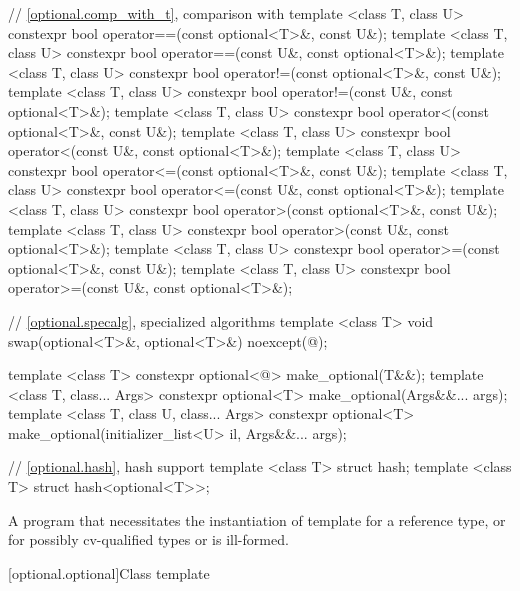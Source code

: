 \begin{codeblock}
{  // \ref{optional.comp_with_t}, comparison with 
  template <class T, class U> constexpr bool operator==(const optional<T>&, const U&);
  template <class T, class U> constexpr bool operator==(const U&, const optional<T>&);
  template <class T, class U> constexpr bool operator!=(const optional<T>&, const U&);
  template <class T, class U> constexpr bool operator!=(const U&, const optional<T>&);
  template <class T, class U> constexpr bool operator<(const optional<T>&, const U&);
  template <class T, class U> constexpr bool operator<(const U&, const optional<T>&);
  template <class T, class U> constexpr bool operator<=(const optional<T>&, const U&);
  template <class T, class U> constexpr bool operator<=(const U&, const optional<T>&);
  template <class T, class U> constexpr bool operator>(const optional<T>&, const U&);
  template <class T, class U> constexpr bool operator>(const U&, const optional<T>&);
  template <class T, class U> constexpr bool operator>=(const optional<T>&, const U&);
  template <class T, class U> constexpr bool operator>=(const U&, const optional<T>&);

  // \ref{optional.specalg}, specialized algorithms
  template <class T>
    void swap(optional<T>&, optional<T>&) noexcept(@\seebelow@);

  template <class T>
    constexpr optional<@\seebelow@> make_optional(T&&);
  template <class T, class... Args>
    constexpr optional<T> make_optional(Args&&... args);
  template <class T, class U, class... Args>
    constexpr optional<T> make_optional(initializer_list<U> il, Args&&... args);

  // \ref{optional.hash}, hash support
  template <class T> struct hash;
  template <class T> struct hash<optional<T>>;
}
\end{codeblock}

\pnum
A program that necessitates the instantiation of template  for
a reference type, or for possibly cv-qualified types  or
 is ill-formed.

[optional.optional]{Class template }


